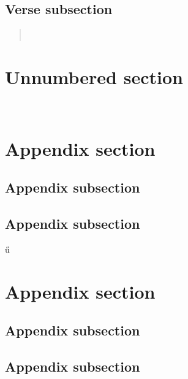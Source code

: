 \documentclass[twoside,12pt]{article}
\begin{document}
		\subsection{Verse subsection}
			\begin{verse}
				\lipsum[1]\\
				\lipsum[1]
			\end{verse}
	\newpage
	\section*{Unnumbered section}
		\markboth[]{}
		\label{unnumbered-section}
		\lipsum[15-20]\\
		\lipsum[15-20]
	\newpage
	\appendix
	\section{Appendix section}
		\subsection{Appendix subsection}
			\label{appendix-label}
			\lipsum[1]
		\subsection{Appendix subsection}ű
			\lipsum[1]
	\section{Appendix section}
		\subsection{Appendix subsection}
			\lipsum[1]
		\subsection{Appendix subsection}
			\lipsum[1]
			
\end{document}
